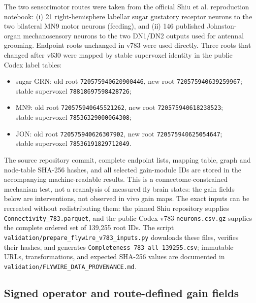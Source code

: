 \documentclass[
  aps,prl,preprint,notitlepage,superscriptaddress,nofootinbib,longbibliography,
  amsmath,amssymb
]{revtex4-2}
\begin{document}
The two sensorimotor routes were taken from the official Shiu et al.
reproduction notebook: (i) 21 right-hemisphere labellar
sugar gustatory receptor neurons to the two bilateral MN9 motor neurons
(feeding), and (ii) 146 published Johnston-organ mechanosensory neurons to the
two DN1/DN2 outputs used for antennal grooming.  Endpoint roots unchanged in
v783 were used directly.  Three roots that changed after v630 were mapped by
stable supervoxel identity in the public Codex label tables:
\begin{itemize}
\item sugar GRN: old root \texttt{720575940620900446}, new root
\texttt{720575940639259967};\\ stable supervoxel \texttt{78818697598428726};
\item MN9: old root \texttt{720575940645521262}, new root
\texttt{720575940618238523};\\ stable supervoxel \texttt{78536329000064308};
\item JON: old root \texttt{720575940626307902}, new root
\texttt{720575940625054647};\\ stable supervoxel \texttt{78536191829712049}.
\end{itemize}
The source repository commit, complete endpoint lists,
mapping table, graph and node-table SHA-256 hashes, and all selected gain-module
IDs are stored in the accompanying machine-readable results.  This is a
connectome-constrained mechanism test, not a reanalysis of measured fly brain
states: the gain fields below are interventions, not observed in vivo gain maps.
The exact inputs can be recreated without redistributing them: the pinned Shiu
repository supplies \nolinkurl{Connectivity_783.parquet}, and the public Codex
v783 \nolinkurl{neurons.csv.gz} supplies the complete ordered set of 139,255
root IDs.  The script
\nolinkurl{validation/prepare_flywire_v783_inputs.py} downloads these files,
verifies their hashes, and generates
\nolinkurl{Completeness_783_all_139255.csv}; immutable URLs, transformations,
and expected SHA-256 values are documented in
\nolinkurl{validation/FLYWIRE_DATA_PROVENANCE.md}.

\subsection{Signed operator and route-defined gain fields}
\end{document}
